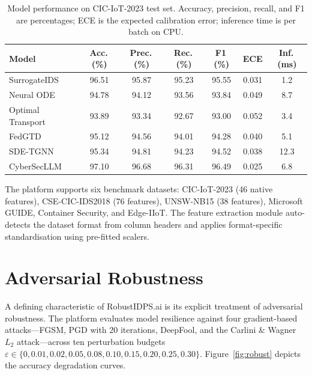 \documentclass[11pt,a4paper]{article}
\begin{document}
\begin{table}[H]
\centering
\caption{Model performance on CIC-IoT-2023 test set. Accuracy, precision,
recall, and F1 are percentages; ECE is the expected calibration error;
inference time is per batch on CPU.}
\label{tab:perf}
\small
\begin{tabular}{@{}lcccccc@{}}
\toprule
Model & Acc.\,(\%) & Prec.\,(\%) & Rec.\,(\%) & F1\,(\%) & ECE & Inf.\,(ms) \\
\midrule
SurrogateIDS        & 96.51 & 95.87 & 95.23 & 95.55 & 0.031 & 1.2  \\
Neural ODE          & 94.78 & 94.12 & 93.56 & 93.84 & 0.049 & 8.7  \\
Optimal Transport   & 93.89 & 93.34 & 92.67 & 93.00 & 0.052 & 3.4  \\
FedGTD              & 95.12 & 94.56 & 94.01 & 94.28 & 0.040 & 5.1  \\
SDE-TGNN            & 95.34 & 94.81 & 94.23 & 94.52 & 0.038 & 12.3 \\
CyberSecLLM         & 97.10 & 96.68 & 96.31 & 96.49 & 0.025 & 6.8  \\
\bottomrule
\end{tabular}
\end{table}

The platform supports six benchmark datasets: CIC-IoT-2023 (46 native
features), CSE-CIC-IDS2018 (76 features), UNSW-NB15 (38 features),
Microsoft GUIDE, Container Security, and Edge-IIoT. The feature extraction
module auto-detects the dataset format from column headers and applies
format-specific standardisation using pre-fitted scalers.

\section{Adversarial Robustness}

A defining characteristic of RobustIDPS.ai is its explicit treatment of
adversarial robustness. The platform evaluates model resilience against
four gradient-based attacks---FGSM, PGD with 20 iterations, DeepFool,
and the Carlini \& Wagner $L_2$ attack---across ten perturbation budgets
$\varepsilon \in \{0, 0.01, 0.02, 0.05, 0.08, 0.10, 0.15, 0.20, 0.25,
0.30\}$. Figure~\ref{fig:robust} depicts the accuracy degradation curves.
\end{document}
